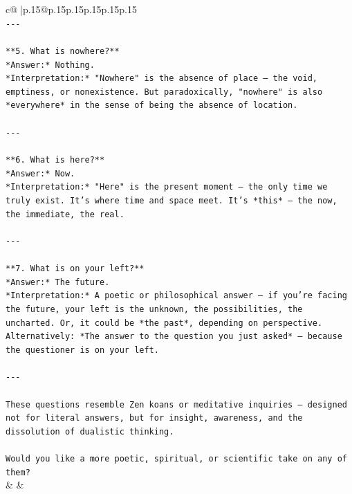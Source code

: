 \documentclass{article}
\begin{document}
{\begin{supertabular}{c@{$\;$}|p{.15\linewidth}@{}p{.15\linewidth}p{.15\linewidth}p{.15\linewidth}p{.15\linewidth}p{.15\linewidth}}
{{{\\ 
\texttt{{-}{-}{-}} \\
\\ 
\texttt{**5. What is nowhere?**  } \\
\texttt{*Answer:* Nothing.  } \\
\texttt{*Interpretation:* "Nowhere" is the absence of place — the void, emptiness, or nonexistence. But paradoxically, "nowhere" is also *everywhere* in the sense of being the absence of location.} \\
\\ 
\texttt{{-}{-}{-}} \\
\\ 
\texttt{**6. What is here?**  } \\
\texttt{*Answer:* Now.  } \\
\texttt{*Interpretation:* "Here" is the present moment — the only time we truly exist. It’s where time and space meet. It’s *this* — the now, the immediate, the real.} \\
\\ 
\texttt{{-}{-}{-}} \\
\\ 
\texttt{**7. What is on your left?**  } \\
\texttt{*Answer:* The future.  } \\
\texttt{*Interpretation:* A poetic or philosophical answer — if you're facing the future, your left is the unknown, the possibilities, the uncharted. Or, it could be *the past*, depending on perspective.  } \\
\texttt{Alternatively: *The answer to the question you just asked* — because the questioner is on your left.} \\
\\ 
\texttt{{-}{-}{-}} \\
\\ 
\texttt{These questions resemble Zen koans or meditative inquiries — designed not for literal answers, but for insight, awareness, and the dissolution of dualistic thinking.} \\
\\ 
\texttt{Would you like a more poetic, spiritual, or scientific take on any of them?} \\
            }
        }
    }
    & & \\ \\


\end{supertabular}}
\end{document}
